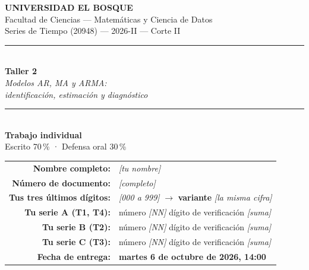 \documentclass[11pt,a4paper,oneside]{article}
\newcommand{\marcador}[1]{\textcolor{grismarcador}{\textit{[#1]}}}
\begin{document}
\thispagestyle{empty}
\begin{center}

{\large\textbf{UNIVERSIDAD EL BOSQUE}}\\[0.15cm]
{\normalsize Facultad de Ciencias --- Matemáticas y Ciencia de Datos}\\[0.1cm]
{\normalsize Series de Tiempo (20948) --- 2026-II --- Corte II}\\[0.9cm]

\rule{\textwidth}{1.2pt}\\[0.25cm]
{\LARGE\textbf{Taller 2}}\\[0.15cm]
{\large\textit{Modelos AR, MA y ARMA:\\ identificación, estimación y diagnóstico}}\\[0.25cm]
\rule{\textwidth}{1.2pt}\\[0.9cm]

{\large\textbf{Trabajo individual}}\\[0.15cm]
{\normalsize Escrito 70\,\% \quad · \quad Defensa oral 30\,\%}\\[1.0cm]

\end{center}

\begin{tabular}{rl}
\textbf{Nombre completo:}          & \marcador{tu nombre} \\[0.25cm]
\textbf{Número de documento:}      & \marcador{completo} \\[0.25cm]
\textbf{Tus tres últimos dígitos:} & \marcador{000 a 999} \quad $\rightarrow$ \quad
                                     \textbf{variante} \marcador{la misma cifra} \\[0.25cm]
\textbf{Tu serie A (T1, T4):}      & número \marcador{NN} \quad dígito de verificación \marcador{suma} \\[0.25cm]
\textbf{Tu serie B (T2):}          & número \marcador{NN} \quad dígito de verificación \marcador{suma} \\[0.25cm]
\textbf{Tu serie C (T3):}          & número \marcador{NN} \quad dígito de verificación \marcador{suma} \\[0.25cm]
\textbf{Fecha de entrega:}         & \textbf{martes 6 de octubre de 2026, 14:00} \\
\end{tabular}
\end{document}
